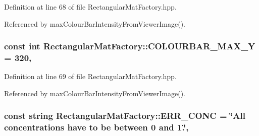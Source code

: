 Definition at line 68 of file Rectangular\-Mat\-Factory.\-hpp.



Referenced by max\-Colour\-Bar\-Intensity\-From\-Viewer\-Image().

\hypertarget{classmultiscale_1_1analysis_1_1RectangularMatFactory_a5a9cd4ea96ec3c9bddcf610d397d187a}{
\subsubsection[{C\-O\-L\-O\-U\-R\-B\-A\-R\-\_\-\-M\-A\-X\-\_\-\-Y}]{\setlength{\rightskip}{0pt plus 5cm}const int Rectangular\-Mat\-Factory\-::\-C\-O\-L\-O\-U\-R\-B\-A\-R\-\_\-\-M\-A\-X\-\_\-\-Y = 320\hspace{0.3cm}{\ttfamily [static]}, {\ttfamily [private]}}}\label{classmultiscale_1_1analysis_1_1RectangularMatFactory_a5a9cd4ea96ec3c9bddcf610d397d187a}


Definition at line 69 of file Rectangular\-Mat\-Factory.\-hpp.



Referenced by max\-Colour\-Bar\-Intensity\-From\-Viewer\-Image().

\hypertarget{classmultiscale_1_1analysis_1_1RectangularMatFactory_a43300d891b115e25dfa33507c74cb8ab}{
\subsubsection[{E\-R\-R\-\_\-\-C\-O\-N\-C}]{\setlength{\rightskip}{0pt plus 5cm}const string Rectangular\-Mat\-Factory\-::\-E\-R\-R\-\_\-\-C\-O\-N\-C = \char`\"{}All concentrations have to be between 0 and 1.\char`\"{}\hspace{0.3cm}{\ttfamily [static]}, {\ttfamily [private]}}}\label{classmultiscale_1_1analysis_1_1RectangularMatFactory_a43300d891b115e25dfa33507c74cb8ab}


